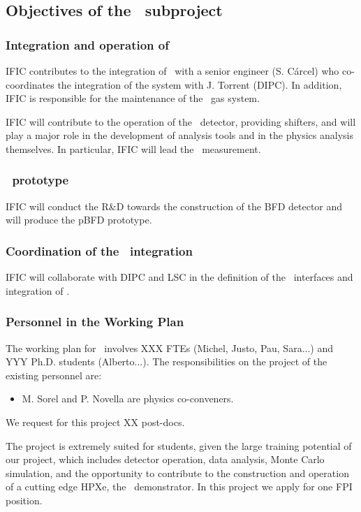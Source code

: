 \subsection{Objectives of the \sIFIC\ subproject}
\label{sec.obj.dipc}
\subsubsection*{Integration and operation of \Next}

\indent

IFIC contributes to the integration of \Next\ with a senior engineer (S. C\'arcel) who co-coordinates the integration of the system with J. Torrent (DIPC). In addition, IFIC is responsible for the maintenance of the \Next\ gas system. 

\indent

IFIC will contribute to the operation of the \Next\ detector, providing shifters, and will play a major role in the development of analysis tools and in the
physics analysis themselves. In particular, IFIC will lead the \bbtnu\ measurement. 


\subsubsection*{\HDEMO\ prototype}

\indent

IFIC will conduct the R\&D towards the construction of the BFD detector and will produce the pBFD prototype. 
 

\subsubsection*{Coordination of the \NHD\ integration}

IFIC will collaborate with DIPC and LSC in the definition of the \NHD\ interfaces and integration of \NHD. 



\subsubsection*{Personnel in the Working Plan}
The working plan for \sIFIC\ involves XXX FTEs (Michel, Justo, Pau, Sara...) and YYY Ph.D. students (Alberto...). The responsibilities on the project of the existing personnel are:


\begin{itemize}[noitemsep,topsep=0pt,parsep=0pt,partopsep=0pt]
\item M. Sorel and P. Novella are physics co-conveners. 
\end{itemize}

We request for this project XX post-docs. 

The project is extremely suited for students, given the large training potential of our project, which includes detector operation, data analysis, Monte Carlo simulation, and the opportunity to contribute to the construction and operation of a cutting edge HPXe, the \HDEMO\ demonstrator. In this project we apply for one FPI position. 
